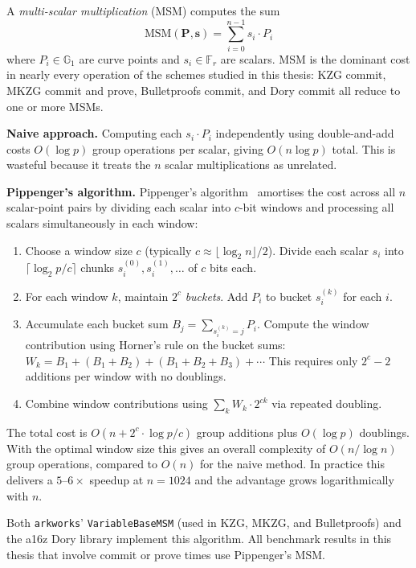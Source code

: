 A \emph{multi-scalar multiplication} (MSM) computes the sum
\begin{equation}
    \mathrm{MSM}(\mathbf{P}, \mathbf{s})
    = \sum_{i=0}^{n-1} s_i \cdot P_i
\end{equation}
where $P_i \in \mathbb{G}_1$ are curve points and $s_i \in \mathbb{F}_r$
are scalars. MSM is the dominant cost in nearly every operation of the
schemes studied in this thesis: KZG commit, MKZG commit and prove,
Bulletproofs commit, and Dory commit all reduce to one or more MSMs.

\textbf{Naive approach.}
Computing each $s_i \cdot P_i$ independently using double-and-add costs
$O(\log p)$ group operations per scalar, giving $O(n \log p)$ total. This
is wasteful because it treats the $n$ scalar multiplications as unrelated.

\textbf{Pippenger's algorithm.}
Pippenger's algorithm~\cite{pippenger1976} amortises the cost across all
$n$ scalar-point pairs by dividing each scalar into $c$-bit windows and
processing all scalars simultaneously in each window:

\begin{enumerate}
    \item Choose a window size $c$ (typically $c \approx \lfloor\log_2 n\rfloor / 2$).
          Divide each scalar $s_i$ into $\lceil\log_2 p / c\rceil$ chunks
          $s_i^{(0)}, s_i^{(1)}, \ldots$ of $c$ bits each.
    \item For each window $k$, maintain $2^c$ \emph{buckets}.
          Add $P_i$ to bucket $s_i^{(k)}$ for each $i$.
    \item Accumulate each bucket sum $B_j = \sum_{s_i^{(k)} = j} P_i$.
          Compute the window contribution using Horner's rule on the
          bucket sums:
          $W_k = B_1 + (B_1 + B_2) + (B_1 + B_2 + B_3) + \cdots$
          This requires only $2^c - 2$ additions per window with no
          doublings.
    \item Combine window contributions using
          $\sum_k W_k \cdot 2^{ck}$ via repeated doubling.
\end{enumerate}

The total cost is $O(n + 2^c \cdot \log p / c)$ group additions plus
$O(\log p)$ doublings. With the optimal window size this gives an overall
complexity of $O(n / \log n)$ group operations, compared to $O(n)$ for
the naive method. In practice this delivers a $5$--$6\times$ speedup at
$n = 1024$ and the advantage grows logarithmically with $n$.

Both \texttt{arkworks}' \texttt{VariableBaseMSM} (used in KZG, MKZG,
and Bulletproofs) and the a16z Dory library implement this algorithm.
All benchmark results in this thesis that involve commit or prove times
use Pippenger's MSM.

